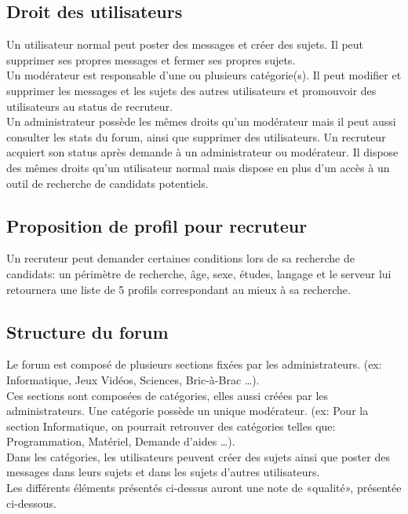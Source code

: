 \documentclass{report}
\begin{document}
\subsection{Droit des utilisateurs}
		Un utilisateur normal peut poster des messages et    	créer des sujets. Il peut supprimer ses propres messages et 	fermer ses propres sujets.\\
		Un modérateur est responsable d’une ou plusieurs 	catégorie(s). Il peut modifier et supprimer les 			messages et les sujets des autres utilisateurs et 			promouvoir des utilisateurs au status de recruteur.\\
		Un administrateur possède les mêmes droits qu'un 	modérateur mais il peut aussi consulter les stats du 		forum, ainsi que supprimer des utilisateurs.
		Un recruteur acquiert son status après demande à un 	administrateur ou modérateur. Il dispose des mêmes 	droits 	qu'un utilisateur normal mais dispose en plus d'un accès à un 	outil de recherche de candidats potentiels.\\

\subsection{Proposition de profil pour recruteur}
		Un recruteur peut demander certaines conditions 	lors de sa recherche de candidats: un périmètre de 		recherche, âge, sexe, études, langage et le serveur lui 	retournera une liste de 5 profils correspondant au mieux à sa 	recherche.

\subsection{Structure du forum}
		Le forum est composé de plusieurs sections fixées 	par les administrateurs. (ex:  Informatique, Jeux Vidéos, 	Sciences, Bric-à-Brac …).\\
		Ces sections sont composées de catégories, elles 	aussi créées par les administrateurs. Une catégorie 		possède un unique modérateur. (ex: Pour la section 		Informatique, on pourrait retrouver des catégories telles 	que:  Programmation, Matériel, Demande d'aides …).\\
		Dans les catégories, les utilisateurs peuvent créer 	des sujets ainsi que poster des messages dans leurs 		sujets et dans les sujets d'autres utilisateurs.\\
		Les différents éléments présentés ci-dessus auront 	une note de «qualité», présentée ci-dessous.\\
\end{document}
